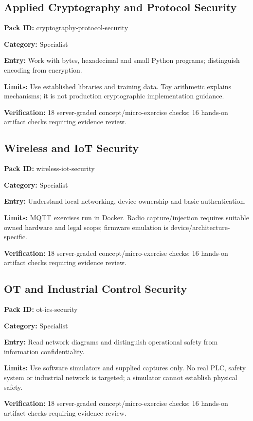 \subsection{Applied Cryptography and Protocol Security}
\noindent\textbf{Pack ID:} cryptography-protocol-security\par
\noindent\textbf{Category:} Specialist\par
\noindent\textbf{Entry:} Work with bytes, hexadecimal and small Python programs; distinguish encoding from encryption.\par
\noindent\textbf{Limits:} Use established libraries and training data. Toy arithmetic explains mechanisms; it is not production cryptographic implementation guidance.\par
\noindent\textbf{Verification:} 18 server-graded concept/micro-exercise checks; 16 hands-on artifact checks requiring evidence review.\par
\subsection{Wireless and IoT Security}
\noindent\textbf{Pack ID:} wireless-iot-security\par
\noindent\textbf{Category:} Specialist\par
\noindent\textbf{Entry:} Understand local networking, device ownership and basic authentication.\par
\noindent\textbf{Limits:} MQTT exercises run in Docker. Radio capture/injection requires suitable owned hardware and legal scope; firmware emulation is device/architecture-specific.\par
\noindent\textbf{Verification:} 18 server-graded concept/micro-exercise checks; 16 hands-on artifact checks requiring evidence review.\par
\subsection{OT and Industrial Control Security}
\noindent\textbf{Pack ID:} ot-ics-security\par
\noindent\textbf{Category:} Specialist\par
\noindent\textbf{Entry:} Read network diagrams and distinguish operational safety from information confidentiality.\par
\noindent\textbf{Limits:} Use software simulators and supplied captures only. No real PLC, safety system or industrial network is targeted; a simulator cannot establish physical safety.\par
\noindent\textbf{Verification:} 18 server-graded concept/micro-exercise checks; 16 hands-on artifact checks requiring evidence review.\par
